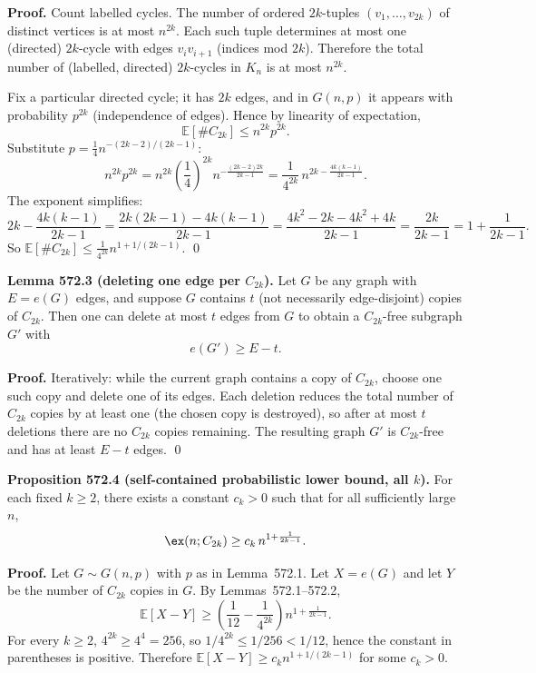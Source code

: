 \textbf{Proof.}
Count labelled cycles. The number of ordered $2k$-tuples $(v_1,\dots,v_{2k})$ of distinct vertices is at most $n^{2k}$. Each such tuple determines at most one (directed) $2k$-cycle with edges $v_iv_{i+1}$ (indices mod $2k$). Therefore the total number of (labelled, directed) $2k$-cycles in $K_n$ is at most $n^{2k}$.

Fix a particular directed cycle; it has $2k$ edges, and in $G(n,p)$ it appears with probability $p^{2k}$ (independence of edges). Hence by linearity of expectation,
\[
\mathbb E[\#C_{2k}] \le n^{2k} p^{2k}.
\]
Substitute $p=\frac{1}{4}n^{-(2k-2)/(2k-1)}$:
\[
n^{2k}p^{2k} = n^{2k}\left(\frac{1}{4}\right)^{2k} n^{-\frac{(2k-2)2k}{2k-1}}
= \frac{1}{4^{2k}}\,n^{2k-\frac{4k(k-1)}{2k-1}}.
\]
The exponent simplifies:
\[
2k-\frac{4k(k-1)}{2k-1} = \frac{2k(2k-1)-4k(k-1)}{2k-1} = \frac{4k^2-2k-4k^2+4k}{2k-1} = \frac{2k}{2k-1} = 1+\frac{1}{2k-1}.
\]
So $\mathbb E[\#C_{2k}]\le \frac{1}{4^{2k}} n^{1+1/(2k-1)}$.
\qed

\medskip

\textbf{Lemma 572.3 (deleting one edge per $C_{2k}$).}
Let $G$ be any graph with $E=e(G)$ edges, and suppose $G$ contains $t$ (not necessarily edge-disjoint) copies of $C_{2k}$. Then one can delete at most $t$ edges from $G$ to obtain a $C_{2k}$-free subgraph $G'$ with
\[
e(G')\ge E-t.
\]

\textbf{Proof.}
Iteratively: while the current graph contains a copy of $C_{2k}$, choose one such copy and delete one of its edges. Each deletion reduces the total number of $C_{2k}$ copies by at least one (the chosen copy is destroyed), so after at most $t$ deletions there are no $C_{2k}$ copies remaining. The resulting graph $G'$ is $C_{2k}$-free and has at least $E-t$ edges.
\qed

\medskip

\textbf{Proposition 572.4 (self-contained probabilistic lower bound, all $k$).}
For each fixed $k\ge 2$, there exists a constant $c_k>0$ such that for all sufficiently large $n$,
\[
\ex(n;C_{2k}) \ge c_k\,n^{1+\frac{1}{2k-1}}.
\]

\textbf{Proof.}
Let $G\sim G(n,p)$ with $p$ as in Lemma~572.1. Let $X=e(G)$ and let $Y$ be the number of $C_{2k}$ copies in $G$. By Lemmas~572.1--572.2,
\[
\mathbb E[X-Y] \ge \left(\frac{1}{12}-\frac{1}{4^{2k}}\right) n^{1+\frac{1}{2k-1}}.
\]
For every $k\ge 2$, $4^{2k}\ge 4^4=256$, so $1/4^{2k}\le 1/256 < 1/12$, hence the constant in parentheses is positive. Therefore $\mathbb E[X-Y]\ge c_k n^{1+1/(2k-1)}$ for some $c_k>0$.

